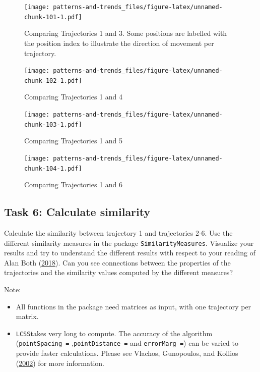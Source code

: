 \documentclass[]{book}
\providecommand{\tightlist}{%
  \setlength{\itemsep}{0pt}\setlength{\parskip}{0pt}}
\begin{document}
\begin{figure}
\centering
\texttt{[image: patterns-and-trends\_files/figure-latex/unnamed-chunk-101-1.pdf]}
\caption{\label{fig:unnamed-chunk-101}Comparing Trajectories 1 and 3. Some positions are labelled with the position index to illustrate the direction of movement per trajectory.}
\end{figure}

\begin{figure}
\centering
\texttt{[image: patterns-and-trends\_files/figure-latex/unnamed-chunk-102-1.pdf]}
\caption{\label{fig:unnamed-chunk-102}Comparing Trajectories 1 and 4}
\end{figure}

\begin{figure}
\centering
\texttt{[image: patterns-and-trends\_files/figure-latex/unnamed-chunk-103-1.pdf]}
\caption{\label{fig:unnamed-chunk-103}Comparing Trajectories 1 and 5}
\end{figure}

\begin{figure}
\centering
\texttt{[image: patterns-and-trends\_files/figure-latex/unnamed-chunk-104-1.pdf]}
\caption{\label{fig:unnamed-chunk-104}Comparing Trajectories 1 and 6}
\end{figure}

\hypertarget{task-6-calculate-similarity}{%
\subsection{Task 6: Calculate similarity}\label{task-6-calculate-similarity}}

Calculate the similarity between trajectory 1 and trajectories 2-6. Use the different similarity measures in the package \texttt{SimilarityMeasures}. Visualize your results and try to understand the different results with respect to your reading of Alan Both (\protect\hyperlink{ref-both2018}{2018}). Can you see connections between the properties of the trajectories and the similarity values computed by the different measures?

Note:

\begin{itemize}
\tightlist
\item
  All functions in the package need matrices as input, with one trajectory per matrix.
\item
  \texttt{LCSS}takes very long to compute. The accuracy of the algorithm (\texttt{pointSpacing\ =} ,\texttt{pointDistance\ =} and \texttt{errorMarg\ =}) can be varied to provide faster calculations. Please see Vlachos, Gunopoulos, and Kollios (\protect\hyperlink{ref-vlachos2002}{2002}) for more information.
\end{itemize}
\end{document}
